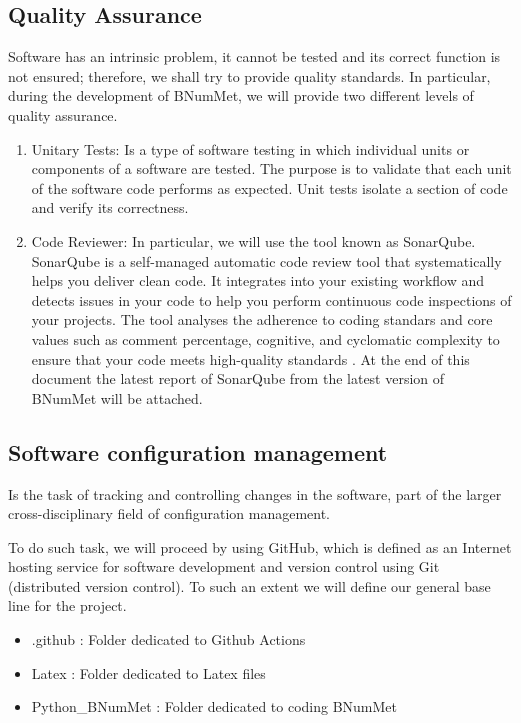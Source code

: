 \subsection{Quality Assurance}
Software has an intrinsic problem, it cannot be tested and its correct function is not ensured; therefore, we shall try to provide quality standards. In particular, during the development of BNumMet, we will provide two different levels of quality assurance.
\begin{enumerate}
    \item Unitary Tests: Is a type of software testing in which individual units or components of a software are tested. The purpose is to validate that each unit of the software code performs as expected.  Unit tests isolate a section of code and verify its correctness. 
    
    \item Code Reviewer: In particular, we will use the tool known as SonarQube. SonarQube is a self-managed automatic code review tool that systematically helps you deliver clean code. It integrates into your existing workflow and detects issues in your code to help you perform continuous code inspections of your projects. The tool analyses the adherence to coding standars and core values such as comment percentage, cognitive, and cyclomatic complexity to ensure that your code meets high-quality standards \cite{sonarsource} \cite{sonarqube}. At the end of this document the latest report of SonarQube from the latest version of BNumMet will be attached.
\end{enumerate}


\subsection{Software configuration management}
Is the task of tracking and controlling changes in the software, part of the larger cross-disciplinary field of configuration management.\cite{Pre94}

To do such task, we will proceed by using GitHub, which is defined as an Internet hosting service for software development and version control using Git (distributed version control). To such an extent we will define our general base line for the project.
\begin{itemize}
    \item .github : Folder dedicated to Github Actions
    \item Latex : Folder dedicated to Latex files 
    \item Python\_BNumMet : Folder dedicated to coding BNumMet
\end{itemize}

